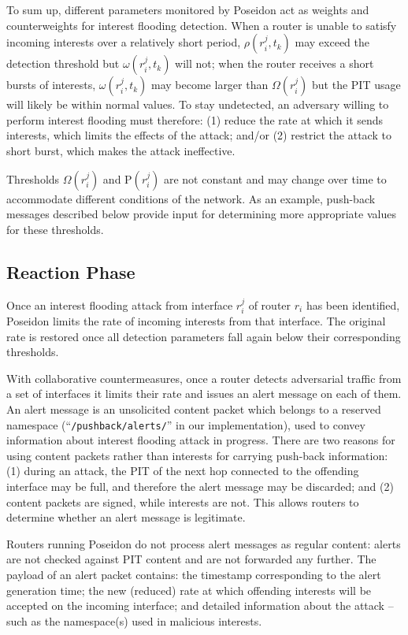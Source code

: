 \documentclass[10pt,conference,letterpaper]{IEEEtran}
\newcommand{\Rho}{\mathrm{P}}
\newcommand{\ndnname}[1]{{\small \tt #1}}
\begin{document}
To sum up, different parameters monitored by Poseidon act as weights and counterweights 
for interest flooding detection. When a router is unable to satisfy incoming interests over a relatively short period, $\rho(r_i^j, t_k)$ may exceed the detection threshold but $\omega(r_i^j, t_k)$ will not; when the router receives a short bursts of interests, $\omega(r_i^j, t_k)$ may become larger than $\Omega(r_i^j)$ but the PIT usage will likely be within normal values. To stay undetected, an adversary willing to perform interest flooding  must therefore: (1) reduce the rate at which it sends interests, which limits the effects of the attack; and/or (2) restrict the attack to short burst, which makes the attack ineffective.

Thresholds $\Omega(r_i^j)$ and $\Rho(r_i^j)$ are not constant and may change over time to accommodate different conditions of the network. As an example, push-back messages described below provide input for determining more appropriate values for these thresholds.


\subsection{Reaction Phase}
\label{reaction-phase}

Once an interest flooding attack from interface $r_i^j$  of router $r_i$ has been identified, Poseidon limits the rate of incoming interests from that interface.
The original rate is restored once all detection parameters fall again below their corresponding thresholds.

With collaborative countermeasures, once a router detects adversarial traffic from a set of interfaces it limits their rate and issues an alert message on each of them.
An alert message is an unsolicited content packet which belongs to a reserved namespace (``\ndnname{/pushback/alerts/}'' in our implementation), used to convey information about interest flooding attack in progress. 
There are two reasons for using content packets rather than interests for carrying push-back information: (1) during an attack, the PIT of the next hop connected to the offending interface may be full, and therefore the alert message may be discarded; and (2) content packets are signed, while interests are not. This allows routers to determine whether an alert message is legitimate.

Routers running Poseidon do not process alert messages as regular content: alerts are not checked against PIT content and are not forwarded any further.
The payload of an alert packet contains: the timestamp corresponding to the alert generation time; the new (reduced) rate at which offending interests will be accepted on the incoming interface; and detailed information about the attack -- such as the namespace(s) used in malicious interests. 
\end{document}
